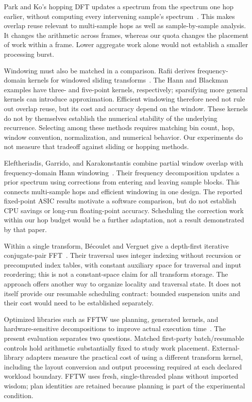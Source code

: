 Park and Ko's hopping DFT updates a spectrum from the spectrum one hop earlier,
without computing every intervening sample's spectrum~\cite{park2014}.
This makes overlap reuse relevant to multi-sample hops as well as sample-by-sample
analysis. It changes the arithmetic across frames, whereas our quota changes
the placement of work within a frame. Lower aggregate work alone would not
establish a smaller processing burst.

Windowing must also be matched in a comparison. Rafii derives frequency-domain
kernels for windowed sliding transforms~\cite{rafii2018}. The Hann and Blackman
examples have three- and five-point kernels, respectively; sparsifying more
general kernels can introduce approximation. Efficient windowing therefore
need not rule out overlap reuse, but its cost and accuracy depend on the window.
These kernels do not by themselves establish the numerical stability of the
underlying recurrence. Selecting among these methods requires matching bin
count, hop, window convention, normalization, and numerical behavior. Our
experiments do not measure that tradeoff against sliding or hopping methods.

Eleftheriadis, Garrido, and Karakonstantis combine partial window overlap with
frequency-domain Hann windowing~\cite{eleftheriadis2023}. Their frequency
decomposition updates a prior spectrum using corrections from entering and
leaving sample blocks. This connects multi-sample hops and efficient windowing
in one design. The reported fixed-point ASIC results motivate a software
comparison, but do not establish CPU savings or long-run floating-point
accuracy. Scheduling the correction work within our hop budget would be a
further adaptation, not a result demonstrated by that paper.

Within a single transform, B\'ecoulet and Verguet give a depth-first iterative
conjugate-pair FFT~\cite{becoulet2021}. Their traversal uses integer indexing
without recursion or precomputed index tables, with constant auxiliary space
for traversal and input reordering; this is not a constant-space claim for all
transform storage. The approach offers another way to organize locality and
traversal state. It does not itself provide our resumable scheduling contract:
bounded suspension units and their cost would need to be established separately.

Optimized libraries such as FFTW use planning, generated kernels, and
hardware-sensitive decompositions to improve actual execution
time~\cite{frigo2005}. The present evaluation separates two questions. Matched
first-party batch/resumable controls hold arithmetic substantially fixed to
study work placement. External-library adapters measure the practical cost of
using a different transform kernel, including the layout conversion and output
processing required at each declared workload boundary. FFTW uses fresh,
single-threaded  plans without imported wisdom; plan
identities are retained because planning is part of the experimental condition.

